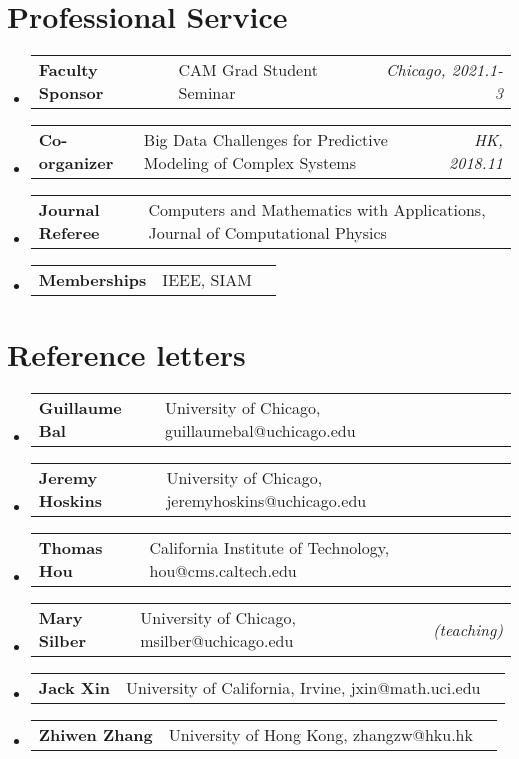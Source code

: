 \documentclass[a4paper,20pt]{article}
\makeatletter
\newcommand{\resumeSubItem}[3]{	\item{
		\begin{tabular*}{0.99\linewidth}{ll@{\extracolsep{\fill}}r}
			\textbf{#1} & #2 &  \textit{#3}
			\end{tabular*}\vspace{-5pt}
		}}
\newcommand{\resumeSubHeadingListStart}{\begin{itemize}[leftmargin=*]}
\newcommand{\resumeSubHeadingListEnd}{\end{itemize}}
\makeatother
\begin{document}
\section{Professional Service}
		 \resumeSubHeadingListStart
		 	\resumeSubItem{Faculty Sponsor }{CAM Grad Student Seminar}{Chicago, 2021.1-3}
	\resumeSubItem{Co-organizer }{Big Data Challenges for Predictive Modeling of Complex Systems}{HK, 2018.11}
	\resumeSubItem{Journal Referee }{ Computers and Mathematics with Applications, Journal of Computational Physics}{}
	\resumeSubItem{Memberships }{IEEE, SIAM}{}
	\resumeSubHeadingListEnd
\section{Reference letters}
 \resumeSubHeadingListStart
\resumeSubItem{Guillaume Bal }{University of Chicago, guillaumebal@uchicago.edu}{}
\resumeSubItem{Jeremy Hoskins }{University of Chicago, jeremyhoskins@uchicago.edu}{}
\resumeSubItem{Thomas Hou }{California Institute of Technology, hou@cms.caltech.edu}{}
\resumeSubItem{Mary Silber }{University of Chicago, msilber@uchicago.edu}{(teaching)}
\resumeSubItem{Jack Xin }{University of California, Irvine, jxin@math.uci.edu}{}
\resumeSubItem{Zhiwen Zhang }{University of Hong Kong, zhangzw@hku.hk}{}
\resumeSubHeadingListEnd
\end{document}
